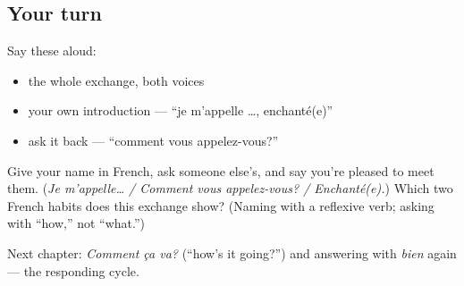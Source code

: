 \subsection*{Your turn}
Say these aloud:

\begin{itemize}
\raggedright
  \item the whole exchange, both voices
  \item your own introduction — \textquotedblleft{}je m'appelle …, enchanté(e)\textquotedblright{}
  \item ask it back — \textquotedblleft{}comment vous appelez-vous?\textquotedblright{}
\end{itemize}

\begin{tcolorbox}[breakable,colback=teal!4,colframe=teal!35!black,title={Before you move on}]
Give your name in French, ask someone else's, and say you're pleased to meet them. (\emph{Je m'appelle… / Comment vous appelez-vous? / Enchanté(e).}) Which two French habits does this exchange show? (Naming with a reflexive verb; asking with \textquotedblleft{}how,\textquotedblright{} not \textquotedblleft{}what.\textquotedblright{})

Next chapter: \emph{Comment ça va?} (\textquotedblleft{}how's it going?\textquotedblright{}) and answering with \emph{bien} again — the responding cycle.
\end{tcolorbox}
